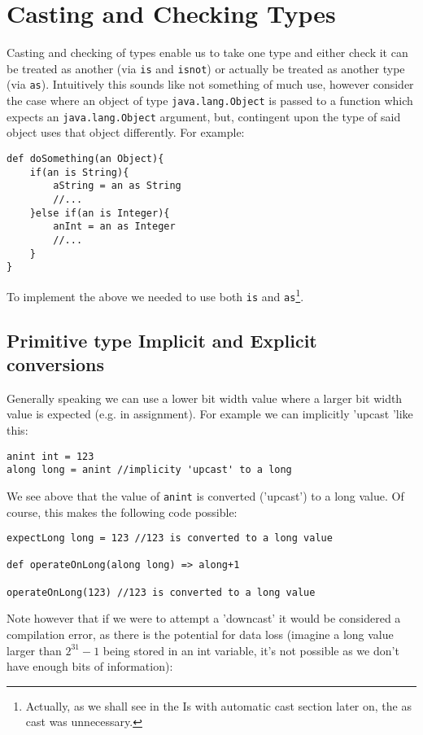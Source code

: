 \documentclass[conc-doc]{subfiles}
\begin{document}
	\chapter[Casting and Checking Types]{Casting and Checking Types}
	\label{ch:castAndcheck}
Casting and checking of types enable us to take one type and either check it can be treated as another (via \lstinline{is} and \lstinline{isnot}) or actually be treated as another type (via \lstinline{as}). Intuitively this sounds like not something of much use, however consider the case where an object of type \lstinline{java.lang.Object} is passed to a function which expects an \lstinline{java.lang.Object} argument, but, contingent upon the type of said object uses that object differently. For example:

\begin{lstlisting}
def doSomething(an Object){
	if(an is String){
		aString = an as String
		//...
	}else if(an is Integer){
		anInt = an as Integer
		//...
	}
}
\end{lstlisting}

To implement the above we needed to use both \lstinline{is} and \lstinline{as}\footnote{Actually, as we shall see in the Is with automatic cast section later on, the as cast was unnecessary.}.

\section{Primitive type Implicit and Explicit conversions}
Generally speaking we can use a lower bit width value where a larger bit width value is expected (e.g. in assignment). For example we can implicitly 'upcast 'like this:

\begin{lstlisting}
anint int = 123
along long = anint //implicity 'upcast' to a long
\end{lstlisting}

We see above that the value of \lstinline{anint} is converted ('upcast') to a long value. Of course, this makes the following code possible:

\begin{lstlisting}
expectLong long = 123 //123 is converted to a long value

def operateOnLong(along long) => along+1

operateOnLong(123) //123 is converted to a long value
\end{lstlisting}

Note however that if we were to attempt a 'downcast' it would be considered a compilation error, as there is the potential for data loss (imagine a long value larger than $2^{31} - 1$ being stored in an int variable, it's not possible as we don't have enough bits of information):
\end{document}

